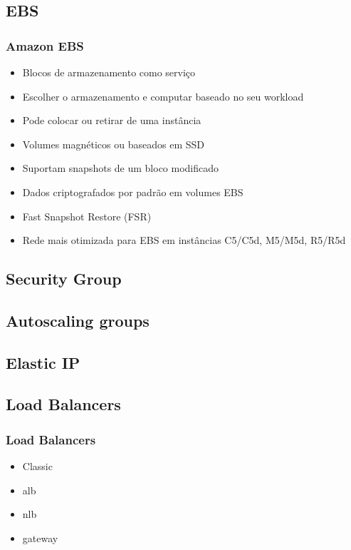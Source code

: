 \subsection{EBS}

\begin{frame}
	\frametitle{Amazon EBS}
	\begin{itemize}
		\item Blocos de armazenamento como serviço
		\item Escolher o armazenamento e computar baseado no seu workload
		\item Pode colocar ou retirar de uma instância
		\item Volumes magnéticos ou baseados em SSD
		\item Suportam snapshots de um bloco modificado
		\item Dados criptografados por padrão em volumes EBS
		\item Fast Snapshot Restore (FSR)
		\item Rede mais otimizada para EBS em instâncias C5/C5d, M5/M5d, R5/R5d
	\end{itemize}
\end{frame}

\subsection{Security Group}

\subsection{Autoscaling groups}

\subsection{Elastic IP}

\subsection{Load Balancers}

\begin{frame}
	\frametitle{Load Balancers}
	\begin{itemize}
		\item Classic
		\item alb
		\item nlb
		\item gateway
	\end{itemize}
\end{frame}


